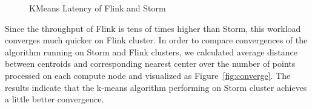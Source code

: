  
\begin{figure}
  \begin{center}
   \caption{KMeans Latency of Flink and Storm}
   \label{fig:kmeans_latency}
  \end{center}
\end{figure}

Since the throughput of Flink is tens of times higher than Storm, this workload converges much quicker on Flink cluster. In order to compare convergences of the algorithm running on Storm and Flink clusters, we calculated average distance between centroids and corresponding nearest center over the number of points processed on each compute node and visualized as Figure~\ref{fig:converge}. The results indicate that the k-means algorithm performing on Storm cluster achieves a little better convergence.


